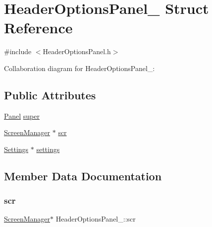 \hypertarget{structHeaderOptionsPanel__}{}\section{Header\+Options\+Panel\+\_\+ Struct Reference}
\label{structHeaderOptionsPanel__}


{\ttfamily \#include $<$Header\+Options\+Panel.\+h$>$}



Collaboration diagram for Header\+Options\+Panel\+\_\+\+:
\subsection*{Public Attributes}
\begin{DoxyCompactItemize}
\item 
\hyperlink{Panel_8h_a034d4c16521db412dc7a1e8536d16fae}{Panel} \hyperlink{structHeaderOptionsPanel___adadc83d631ce69103cb1cfea7f9ff239}{super}
\item 
\hyperlink{ScreenManager_8h_a798c9c69dc8024a4c6829982bf94dddd}{Screen\+Manager} $\ast$ \hyperlink{structHeaderOptionsPanel___af5137144e13bf9446e77aca1983932fc}{scr}
\item 
\hyperlink{Settings_8h_ad97e5960b63f21c02bf5e0e43c0ef002}{Settings} $\ast$ \hyperlink{structHeaderOptionsPanel___afd198e8522ed4b056c534ba0a54a9533}{settings}
\end{DoxyCompactItemize}


\subsection{Member Data Documentation}
\mbox{\label{structHeaderOptionsPanel___af5137144e13bf9446e77aca1983932fc}} 
\subsubsection{\texorpdfstring{scr}{scr}}
{\footnotesize\ttfamily \hyperlink{ScreenManager_8h_a798c9c69dc8024a4c6829982bf94dddd}{Screen\+Manager}$\ast$ Header\+Options\+Panel\+\_\+\+::scr}

\mbox{\label{structHeaderOptionsPanel___afd198e8522ed4b056c534ba0a54a9533}} 
